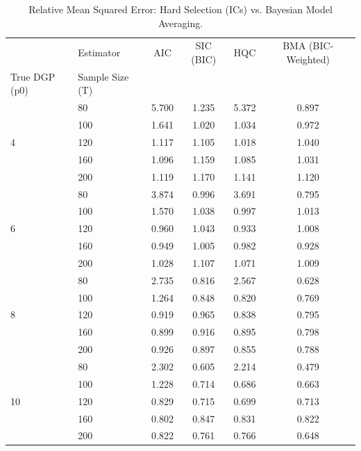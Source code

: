 \begin{table}[htbp]
\centering
\caption{Relative Mean Squared Error: Hard Selection (ICs) vs. Bayesian Model Averaging.}
\label{tab:bma_vs_ic}
\begin{tabular}{llcccc}
\toprule
 & Estimator & AIC & SIC (BIC) & HQC & BMA (BIC-Weighted) \\
True DGP (p0) & Sample Size (T) &  &  &  &  \\
\midrule
\multirow[t]{5}{*}{4} & 80 & 5.700 & 1.235 & 5.372 & 0.897 \\
 & 100 & 1.641 & 1.020 & 1.034 & 0.972 \\
 & 120 & 1.117 & 1.105 & 1.018 & 1.040 \\
 & 160 & 1.096 & 1.159 & 1.085 & 1.031 \\
 & 200 & 1.119 & 1.170 & 1.141 & 1.120 \\
\multirow[t]{5}{*}{6} & 80 & 3.874 & 0.996 & 3.691 & 0.795 \\
 & 100 & 1.570 & 1.038 & 0.997 & 1.013 \\
 & 120 & 0.960 & 1.043 & 0.933 & 1.008 \\
 & 160 & 0.949 & 1.005 & 0.982 & 0.928 \\
 & 200 & 1.028 & 1.107 & 1.071 & 1.009 \\
\multirow[t]{5}{*}{8} & 80 & 2.735 & 0.816 & 2.567 & 0.628 \\
 & 100 & 1.264 & 0.848 & 0.820 & 0.769 \\
 & 120 & 0.919 & 0.965 & 0.838 & 0.795 \\
 & 160 & 0.899 & 0.916 & 0.895 & 0.798 \\
 & 200 & 0.926 & 0.897 & 0.855 & 0.788 \\
\multirow[t]{5}{*}{10} & 80 & 2.302 & 0.605 & 2.214 & 0.479 \\
 & 100 & 1.228 & 0.714 & 0.686 & 0.663 \\
 & 120 & 0.829 & 0.715 & 0.699 & 0.713 \\
 & 160 & 0.802 & 0.847 & 0.831 & 0.822 \\
 & 200 & 0.822 & 0.761 & 0.766 & 0.648 \\
\bottomrule
\end{tabular}
\end{table}
